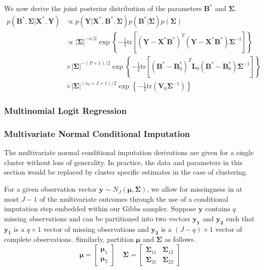 \documentclass[useAMS,referee]{biom}
\newcommand{\tr}{\mbox{tr}}
\begin{document}
We now derive the joint posterior distribution of the parameters $\mathbf{B}^*$ and $\boldsymbol\Sigma$.
\begin{align*} 
p(\mathbf{B}^*,\boldsymbol\Sigma|\mathbf{X}^*,\mathbf{Y}) & \propto  p(\mathbf{Y}|\mathbf{X}^*,\mathbf{B}^*,\boldsymbol\Sigma)p(\mathbf{B}^*|\boldsymbol\Sigma)p(\boldsymbol\Sigma)\\
&  \propto |\boldsymbol\Sigma|^{-n/2}\exp \left \{ -\frac{1}{2} \tr \left [(\mathbf{Y} - \mathbf{X^*}\mathbf{B}^*)^T(\mathbf{Y} - \mathbf{X^*}\mathbf{B}^*)\boldsymbol\Sigma^{-1} \right ]\right \} \\
& \times |\boldsymbol\Sigma|^{-(P+1)/2} \exp \left \{ -\frac{1}{2} \tr \left [(\mathbf{B}^* - \mathbf{B}^*_0)^T \mathbf{L}_0(\mathbf{B}^* - \mathbf{B}^*_0)\boldsymbol\Sigma^{-1} \right ]\right \} \\
& \times |\boldsymbol\Sigma|^{(\nu_0 + J + 1)/2} \exp \left \{ -\frac{1}{2} \tr (\mathbf{V}_0 \boldsymbol\Sigma^{-1}) \right \}
\end{align*}



\subsubsection{Multinomial Logit Regression}

\subsubsection{Multivariate Normal Conditional Imputation}

The multivariate normal conditional imputation derivations are given for a single cluster without loss of generality. In practice, the data and parameters in this section would be replaced by cluster specific estimates in the case of clustering. 

For a given observation vector $\mathbf{y} \sim N_J(\boldsymbol\mu, \boldsymbol\Sigma)$, we allow for missingness in at most $J - 1$ of the multivariate outcomes through the use of a conditional imputation step embedded within our Gibbs sampler. Suppose $\mathbf{y}$ contains $q$ missing observations and can be partitioned into two vectors $\mathbf{y_{1}}$ and $\mathbf{y_{2}}$ such that $\mathbf{y_{1}}$ is a $q \times 1$ vector of missing observations and $\mathbf{y_{2}}$ is a $(J-q) \times 1$ vector of complete observations. Similarly, partition $\boldsymbol\mu$ and $\boldsymbol\Sigma$ as follows.
$$\boldsymbol\mu = \begin{bmatrix} \boldsymbol\mu_1 \\ \boldsymbol\mu_2 \end{bmatrix} \ \ \ \ \ \boldsymbol\Sigma = \begin{bmatrix} \boldsymbol\Sigma_{11} & \boldsymbol\Sigma_{12} \\ \boldsymbol\Sigma_{21} & \boldsymbol\Sigma_{22} \end{bmatrix}$$
\end{document}
